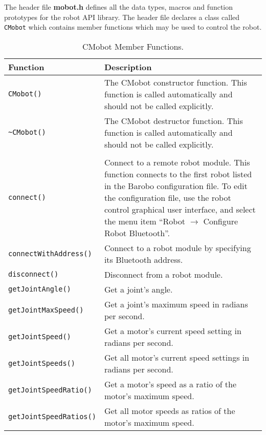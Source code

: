 \noindent
The header file {\bf mobot.h} defines all the data types, macros 
and function prototypes for the robot API library. The header file
declares a class called \texttt{CMobot} which contains member functions which
may be used to control the robot.

\begin{table}[!h]
\begin{center}
\caption{CMobot Member Functions.}
\begin{tabular}{p{38 mm}p{110 mm}}
\hline
Function & Description \\
\hline
\texttt{CMobot()} & The CMobot constructor function. This function
is called automatically and should not be called explicitly. \\
\texttt{\textasciitilde CMobot()} & The CMobot destructor function. This function
is called automatically and should not be called explicitly. \\
& \\
\texttt{connect()} & Connect to a remote robot module. This function 
connects to the first robot listed in the Barobo configuration file. To
edit the configuration file, use the robot control graphical user interface,
and select the menu item ``Robot $\rightarrow$ Configure Robot Bluetooth''. \\
\texttt{connectWithAddress()} & Connect to a robot module by specifying its Bluetooth address. \\
\texttt{disconnect()} & Disconnect from a robot module. \\
\texttt{getJointAngle()} & Get a joint's angle. \\
\texttt{getJointMaxSpeed()} & Get a joint's maximum speed in radians per second. \\
\texttt{getJointSpeed()} & Get a motor's current speed setting in radians per second. \\
\texttt{getJointSpeeds()} & Get all motor's current speed settings in radians per second. \\
\texttt{getJointSpeedRatio()} & Get a motor's speed as a ratio of the motor's maximum speed. \\
\texttt{getJointSpeedRatios()} & Get all motor speeds as ratios of the motor's maximum speed. \\

\end{tabular}
\end{center}
\end{table}

